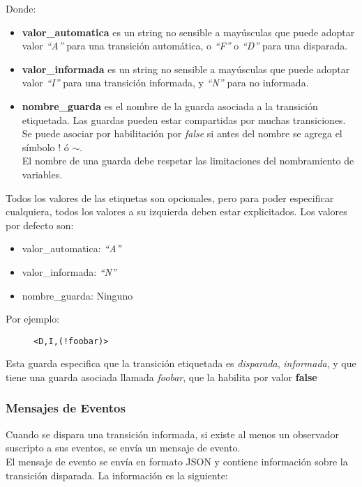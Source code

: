 Donde:
\begin{itemize}
    \item \textbf{valor\_automatica} es un string no sensible a mayúsculas que
    puede adoptar valor \textit{``A''} para una transición automática, o
    \textit{``F''} o \textit{``D''} para una disparada.
    \item \textbf{valor\_informada} es un string no sensible a mayúsculas que
    puede adoptar valor \textit{``I''} para una transición informada, y
    \textit{``N''} para no informada.
    \item \textbf{nombre\_guarda} es el nombre de la guarda asociada a la
    transición etiquetada. Las guardas pueden estar compartidas por muchas
    transiciones. Se puede asociar por habilitación por \textit{false} si antes
    del nombre se agrega el símbolo $!$ ó $\mathtt{\sim}$.\\
    El nombre de una guarda debe respetar las limitaciones del nombramiento de
    variables.
\end{itemize}

Todos los valores de las etiquetas son opcionales, pero para poder especificar
cualquiera, todos los valores a su izquierda deben estar explicitados. Los
valores por defecto son:
\begin{itemize}
    \item valor\_automatica: \textit{``A''}
    \item valor\_informada: \textit{``N''}
    \item nombre\_guarda: Ninguno
\end{itemize}

Por ejemplo:

\begin{figure}[H]
\centering
\begin{verbatim}
<D,I,(!foobar)>
\end{verbatim}
\end{figure}

Esta guarda especifica que la transición etiquetada es \textit{disparada},
\textit{informada}, y que tiene una guarda asociada llamada \textit{foobar}, que
la habilita por valor \textbf{false}

\subsubsection{Mensajes de Eventos}
\label{mensaje_eventos}

Cuando se dispara una transición informada, si existe al menos un observador
suscripto a sus eventos, se envía un mensaje de evento.\\
El mensaje de evento se envía en formato JSON y contiene información sobre la
transición disparada. La información es la siguiente:


